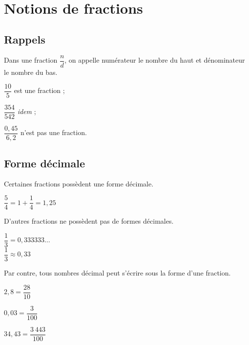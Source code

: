 \documentclass[11pt]{article}
\begin{document}
\section{Notions de fractions}

\subsection{Rappels}

\begin{vocabulaire}
Dans une fraction $\dfrac{n}{d}$, on appelle numérateur le nombre du
haut et dénominateur le nombre du bas.
\end{vocabulaire}

\begin{exemple}
  \begin{enu}
  \item $\dfrac{10}{5}$ est une fraction ;
  \item $\dfrac{354}{542}$ \textit{idem} ;
  \item $\dfrac{0,45}{6,2}$ n'est pas une fraction.
  \end{enu}
\end{exemple}

\subsection{Forme décimale}

\begin{propriete}
Certaines fractions possèdent une forme décimale.
\end{propriete}

\begin{exemple}
$\dfrac{5}{4}=1 + \dfrac{1}{4} = 1,25$
\end{exemple}

\begin{propriete}
D'autres fractions ne possèdent pas de formes décimales.
\end{propriete}

\begin{exemple}
$\dfrac{1}{3}=0,333333\ldots$ \\
$\dfrac{1}{3} \approx 0,33$
\end{exemple}

\begin{propriete}
Par contre, tous nombres décimal peut s'écrire sous la forme d'une
fraction. 
\end{propriete}

\begin{exemple}
  \begin{enu}
  \item $2,8=\dfrac{28}{10}$
  \item $0,03=\dfrac{3}{100}$
  \item $34,43=\dfrac{3~443}{100}$
  \end{enu}
\end{exemple}
\end{document}
